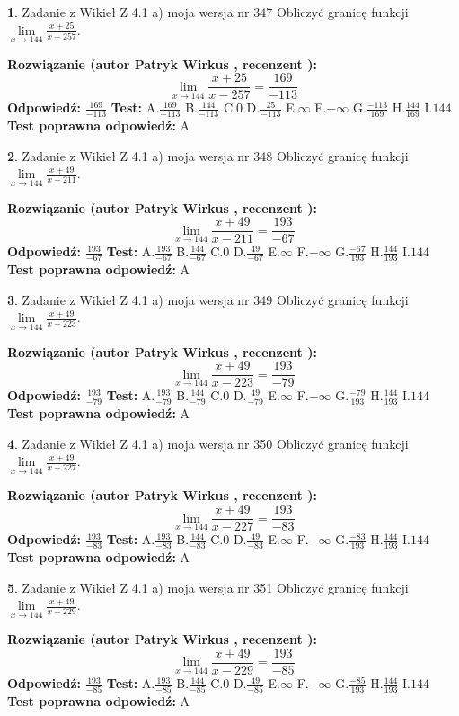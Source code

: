 \documentclass[12pt, a4paper]{article}
\theoremstyle{definition} %
\newtheorem{zad}{}
\newcommand{\zadStart}[1]{\begin{zad}#1\newline}
\newcommand{\zadStop}{\end{zad}}
\newcommand{\rozwStart}[2]{\noindent \textbf{Rozwiązanie (autor #1 , recenzent #2): }\newline}
\newcommand{\rozwStop}{\newline}
\newcommand{\odpStart}{\noindent \textbf{Odpowiedź:}\newline}
\newcommand{\odpStop}{\newline}
\newcommand{\testStart}{\noindent \textbf{Test:}\newline}
\newcommand{\testStop}{\newline}
\newcommand{\kluczStart}{\noindent \textbf{Test poprawna odpowiedź:}\newline}
\newcommand{\kluczStop}{\newline}
\begin{document}
\zadStart{Zadanie z Wikieł Z 4.1 a) moja wersja nr 347}
Obliczyć granicę funkcji $\lim\limits_{x\to144}\frac{x+25}{x-257}$.
\zadStop
\rozwStart{Patryk Wirkus}{}
$$\lim\limits_{x\to144}\frac{x+25}{x-257} = \frac{169}{-113}$$
\rozwStop
\odpStart
$\frac{169}{-113}$
\odpStop
\testStart
A.$\frac{169}{-113}$
B.$\frac{144}{-113}$
C.$0$
D.$\frac{25}{-113}$
E.$\infty$
F.$-\infty$
G.$\frac{-113}{169}$
H.$\frac{144}{169}$
I.$144$
\testStop
\kluczStart
A
\kluczStop



\zadStart{Zadanie z Wikieł Z 4.1 a) moja wersja nr 348}
Obliczyć granicę funkcji $\lim\limits_{x\to144}\frac{x+49}{x-211}$.
\zadStop
\rozwStart{Patryk Wirkus}{}
$$\lim\limits_{x\to144}\frac{x+49}{x-211} = \frac{193}{-67}$$
\rozwStop
\odpStart
$\frac{193}{-67}$
\odpStop
\testStart
A.$\frac{193}{-67}$
B.$\frac{144}{-67}$
C.$0$
D.$\frac{49}{-67}$
E.$\infty$
F.$-\infty$
G.$\frac{-67}{193}$
H.$\frac{144}{193}$
I.$144$
\testStop
\kluczStart
A
\kluczStop



\zadStart{Zadanie z Wikieł Z 4.1 a) moja wersja nr 349}
Obliczyć granicę funkcji $\lim\limits_{x\to144}\frac{x+49}{x-223}$.
\zadStop
\rozwStart{Patryk Wirkus}{}
$$\lim\limits_{x\to144}\frac{x+49}{x-223} = \frac{193}{-79}$$
\rozwStop
\odpStart
$\frac{193}{-79}$
\odpStop
\testStart
A.$\frac{193}{-79}$
B.$\frac{144}{-79}$
C.$0$
D.$\frac{49}{-79}$
E.$\infty$
F.$-\infty$
G.$\frac{-79}{193}$
H.$\frac{144}{193}$
I.$144$
\testStop
\kluczStart
A
\kluczStop



\zadStart{Zadanie z Wikieł Z 4.1 a) moja wersja nr 350}
Obliczyć granicę funkcji $\lim\limits_{x\to144}\frac{x+49}{x-227}$.
\zadStop
\rozwStart{Patryk Wirkus}{}
$$\lim\limits_{x\to144}\frac{x+49}{x-227} = \frac{193}{-83}$$
\rozwStop
\odpStart
$\frac{193}{-83}$
\odpStop
\testStart
A.$\frac{193}{-83}$
B.$\frac{144}{-83}$
C.$0$
D.$\frac{49}{-83}$
E.$\infty$
F.$-\infty$
G.$\frac{-83}{193}$
H.$\frac{144}{193}$
I.$144$
\testStop
\kluczStart
A
\kluczStop



\zadStart{Zadanie z Wikieł Z 4.1 a) moja wersja nr 351}
Obliczyć granicę funkcji $\lim\limits_{x\to144}\frac{x+49}{x-229}$.
\zadStop
\rozwStart{Patryk Wirkus}{}
$$\lim\limits_{x\to144}\frac{x+49}{x-229} = \frac{193}{-85}$$
\rozwStop
\odpStart
$\frac{193}{-85}$
\odpStop
\testStart
A.$\frac{193}{-85}$
B.$\frac{144}{-85}$
C.$0$
D.$\frac{49}{-85}$
E.$\infty$
F.$-\infty$
G.$\frac{-85}{193}$
H.$\frac{144}{193}$
I.$144$
\testStop
\kluczStart
A
\kluczStop
\end{document}
